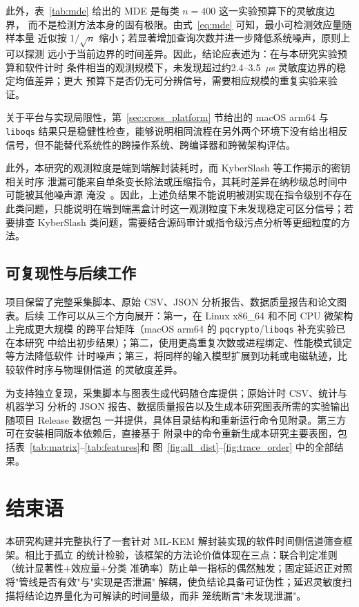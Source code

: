 \documentclass[a4paper,fontset=none]{ctexart}
\begin{document}
此外，表~\ref{tab:mde} 给出的 MDE 是每类 $n=400$ 这一实验预算下的灵敏度边界，
而不是检测方法本身的固有极限。由式~\eqref{eq:mde} 可知，最小可检测效应量随样本量
近似按 $1/\sqrt{n}$ 缩小；若显著增加查询次数并进一步降低系统噪声，原则上可以探测
远小于当前边界的时间差异。因此，结论应表述为：在与本研究实验预算和软件计时
条件相当的观测规模下，未发现超过约2.4--3.5~$\mu$s 灵敏度边界的稳定均值差异；更大
预算下是否仍无可分辨信号，需要相应规模的重复实验来验证。

关于平台与实现局限性，第~\ref{sec:cross_platform} 节给出的 macOS arm64 与
\texttt{liboqs} 结果只是稳健性检查，能够说明相同流程在另外两个环境下没有给出相反
信号，但不能替代系统性的跨操作系统、跨编译器和跨微架构评估。

此外，本研究的观测粒度是端到端解封装耗时，而 KyberSlash 等工作揭示的密钥相关时序
泄漏可能来自单条变长除法或压缩指令，其耗时差异在纳秒级总时间中可能被其他噪声源
淹没~\cite{Bernstein2025}。因此，上述负结果不能说明被测实现在指令级别不存在
此类问题，只能说明在端到端黑盒计时这一观测粒度下未发现稳定可区分信号；若要排查
KyberSlash 类问题，需要结合源码审计或指令级污点分析等更细粒度的方法。

\subsection{可复现性与后续工作}

项目保留了完整采集脚本、原始 CSV、JSON 分析报告、数据质量报告和论文图表。后续
工作可以从三个方向展开：第一，在 Linux x86\_64 和不同 CPU 微架构上完成更大规模
的跨平台矩阵（macOS arm64 的 \texttt{pqcrypto}/\texttt{liboqs} 补充实验已在本研究
中给出初步结果）；第二，使用更高重复次数或进程绑定、性能模式锁定等方法降低软件
计时噪声；第三，将同样的输入模型扩展到功耗或电磁轨迹，比较软件时序与物理侧信道
的灵敏度差异。

为支持独立复现，采集脚本与图表生成代码随仓库提供；原始计时 CSV、统计与机器学习
分析的 JSON 报告、数据质量报告以及生成本研究图表所需的实验输出随项目 Release 数据包
一并提供，具体目录结构和重新运行命令见附录。第三方可在安装相同版本依赖后，直接基于
附录中的命令重新生成本研究主要表图，包括表~\ref{tab:matrix}--\ref{tab:features}和
图~\ref{fig:all_dist}--\ref{fig:trace_order} 中的全部结果。

\section{结束语}
\label{sec:conclusion}

本研究构建并完整执行了一套针对 ML-KEM 解封装实现的软件时间侧信道筛查框架。相比于孤立
的统计检验，该框架的方法论价值体现在三点：联合判定准则（统计显著性$+$效应量$+$分类
准确率）防止单一指标的偶然触发；固定延迟正对照将"管线是否有效"与"实现是否泄漏"
解耦，使负结论具备可证伪性；延迟灵敏度扫描将结论边界量化为可解读的时间量级，而非
笼统断言"未发现泄漏"。
\end{document}
